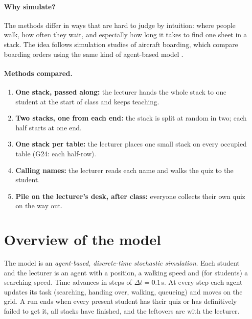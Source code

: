 \documentclass[11pt,a4paper]{article}
\begin{document}
\paragraph{Why simulate?} The methods differ in ways that are hard to judge by intuition: where people walk, how often they wait, and especially how long it takes to find one sheet in a stack.
The idea follows simulation studies of aircraft boarding, which compare boarding orders using the same kind of agent-based model \cite{steffen2008}.

\paragraph{Methods compared.}
\begin{enumerate}[label=\textbf{\arabic*.}]
  \item \textbf{One stack, passed along:} the lecturer hands the whole stack to one student at the start of class and keeps teaching.
  \item \textbf{Two stacks, one from each end:} the stack is split at random in two; each half starts at one end.
  \item \textbf{One stack per table:} the lecturer places one small stack on every occupied table (G24: each half-row).
  \item \textbf{Calling names:} the lecturer reads each name and walks the quiz to the student.
  \item \textbf{Pile on the lecturer's desk, after class:} everyone collects their own quiz on the way out.
\end{enumerate}

\section{Overview of the model}

The model is an \emph{agent-based, discrete-time stochastic simulation}.
Each student and the lecturer is an agent with a position, a walking speed and (for students) a searching speed.
Time advances in steps of $\Delta t = 0.1$\,s. At every step each agent updates its task (searching, handing over, walking, queueing) and moves on the grid.
A run ends when every present student has their quiz or has definitively failed to get it, all stacks have finished, and the leftovers are with the lecturer.
\end{document}
